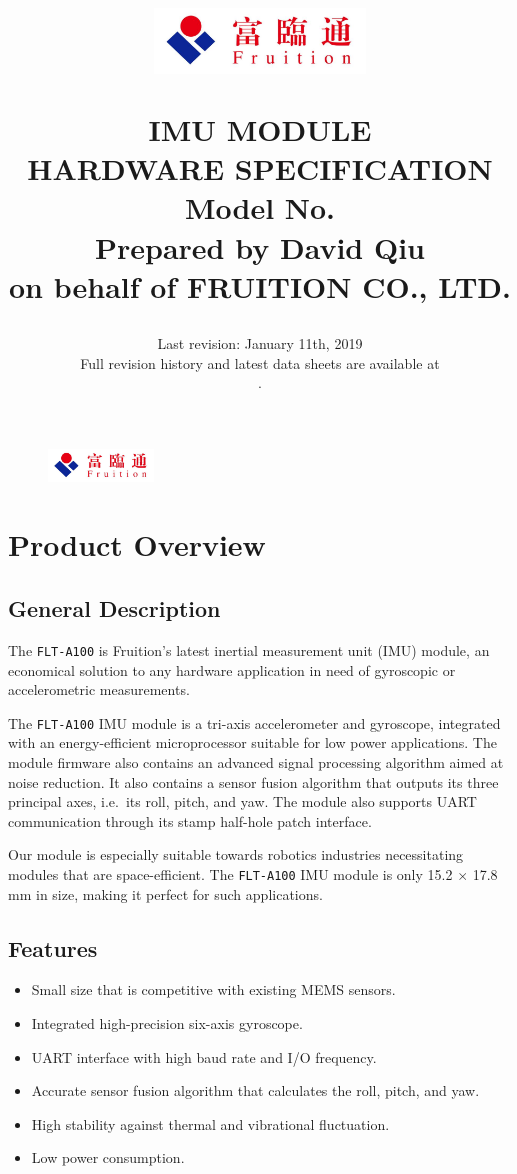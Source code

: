 \documentclass{scrreprt}
\title{
	\begin{figure}[H]
		\centering\includegraphics[width=0.5\textwidth]{logo.jpeg}
	\end{figure}
	\vspace{1cm}
	\flushright
	\Huge{IMU MODULE}\\
	\Huge{HARDWARE SPECIFICATION}\\
	\vspace{2cm}
	\huge{Model No. \modelno}\\
	\vspace{2cm}
	\LARGE{Prepared by David Qiu \\ on behalf of FRUITION CO., LTD.}
}
\date{
	Last revision: January 11th, 2019\\
	\vspace{0.5cm}
	Full revision history and latest data sheets are available at\\
	\vspace{0.25cm}
	\upstream.
}
\newcommand{\pchapter}[1]{
	\begingroup\let\clearpage\relax
	\newpage
	\begin{figure}[H]
		\includegraphics[width=0.25\textwidth]{logo.jpeg}
	\end{figure}
	\chapter{#1}
	\endgroup
}
\newcommand{\modelno}{%
	\texttt{FLT-A100}
}
\newcommand{\x}{
	$\times$
}
\begin{document}
\begin{CJK*}{UTF8}{gbsn}
\maketitle
\tableofcontents

\pchapter{Product Overview}
\section{General Description}
The \modelno is Fruition's latest inertial measurement unit (IMU) module, an
economical solution to any hardware application in need of gyroscopic or
accelerometric measurements.

The \modelno IMU module is a tri-axis accelerometer and gyroscope, integrated
with an energy-efficient microprocessor suitable for low power applications. The
module firmware also contains an advanced signal processing algorithm aimed at
noise reduction. It also contains a sensor fusion algorithm that outputs its
three principal axes, i.e.\ its roll, pitch, and yaw. The module also supports
UART communication through its stamp half-hole patch interface.

Our module is especially suitable towards robotics industries necessitating
modules that are space-efficient. The \modelno IMU module is only
15.2\x17.8 mm in size, making it perfect for such applications.

\section{Features}
\begin{itemize}
\item Small size that is competitive with existing MEMS sensors.

\item Integrated high-precision six-axis gyroscope.

\item UART interface with high baud rate and I/O frequency.

\item Accurate sensor fusion algorithm that calculates the roll, pitch, and yaw.

\item High stability against thermal and vibrational fluctuation.

\item Low power consumption.
\end{itemize}


\end{CJK*}
\end{document}
